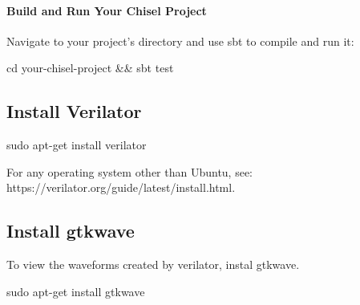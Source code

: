 \paragraph{Build and Run Your Chisel Project}
Navigate to your project's directory and use sbt to compile and run it:
\begin{bashcode}
cd your-chisel-project && sbt test
\end{bashcode}

\subsection{Install Verilator}
\begin{bashcode}
sudo apt-get install verilator
\end{bashcode}

For any operating system other than Ubuntu, see: https://verilator.org/guide/latest/install.html.

\subsection{Install gtkwave}
To view the waveforms created by verilator, instal gtkwave.
\begin{bashcode}
sudo apt-get install gtkwave
\end{bashcode}






